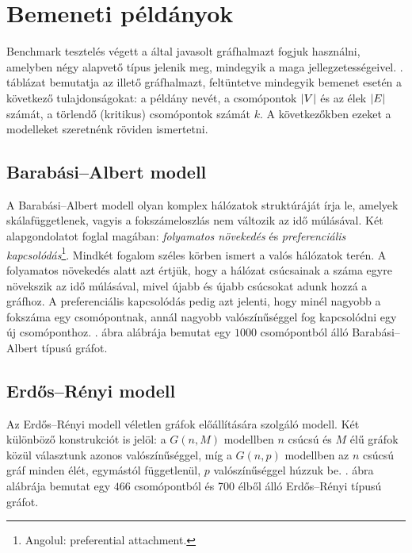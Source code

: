 \section{Bemeneti példányok}\label{sec:BENCHMARK-PROBLEM-INSTANCES}
Benchmark tesztelés végett a  által javasolt gráfhalmazt fogjuk használni, amelyben négy alapvető típus jelenik meg, mindegyik a maga jellegzetességeivel.
. táblázat bemutatja az illető gráfhalmazt, feltüntetve mindegyik bemenet esetén a következő tulajdonságokat:
a példány nevét, a csomópontok $\lvert V\rvert$ és az élek $\lvert E\rvert$ számát, a törlendő (kritikus) csomópontok számát $k$.
A következőkben ezeket a modelleket szeretnénk röviden ismertetni.


\subsection{Barabási–Albert modell}
A Barabási–Albert modell olyan komplex hálózatok struktúráját írja le, amelyek skálafüggetlenek, vagyis a fokszámeloszlás nem változik az idő múlásával.
Két alapgondolatot foglal magában: \textit{folyamatos növekedés} és \textit{preferenciális kapcsolódás}\footnote{ Angolul: preferential attachment. }. Mindkét fogalom széles körben ismert a valós hálózatok terén.
A folyamatos növekedés alatt azt értjük, hogy a hálózat csúcsainak a száma egyre növekszik az idő múlásával, mivel újabb és újabb csúcsokat adunk hozzá a gráfhoz.
A preferenciális kapcsolódás pedig azt jelenti, hogy minél nagyobb a fokszáma egy csomópontnak, annál nagyobb valószínűséggel fog kapcsolódni egy új csomóponthoz.
. ábra  alábrája bemutat egy $1000$ csomópontból álló Barabási–Albert típusú gráfot.


\subsection{Erdős–Rényi modell}
Az Erdős–Rényi modell véletlen gráfok előállítására szolgáló modell. Két különböző konstrukciót is jelöl:
a $G(n, M)$ modellben $n$ csúcsú és $M$ élű gráfok közül választunk azonos valószínűséggel,
míg a $G(n, p)$ modellben az $n$ csúcsú gráf minden élét, egymástól függetlenül, $p$ valószínűséggel húzzuk be.
. ábra  alábrája bemutat egy $466$ csomópontból és 700 élből álló Erdős–Rényi típusú gráfot.


